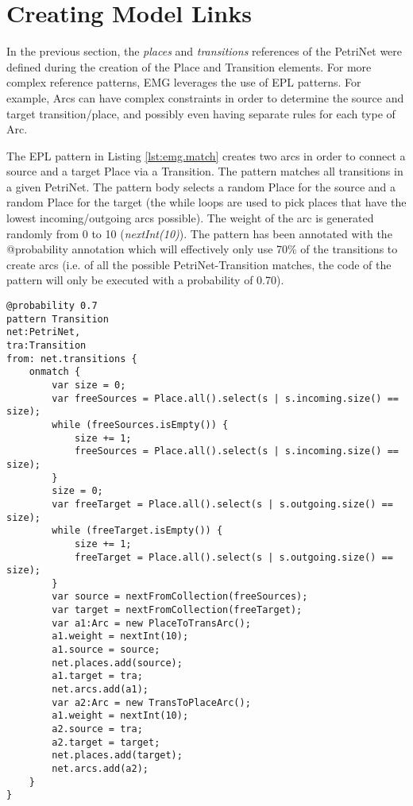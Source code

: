 \section{Creating Model Links}\label{sec:emg.createlinks}

In the previous section, the \emph{places} and \emph{transitions} references of the PetriNet were defined during the creation of the Place and Transition elements. For more complex reference patterns, EMG leverages the use of EPL patterns. For example, Arcs can have complex constraints in order to determine the source and target transition/place, and possibly even having separate rules for each type of Arc.

The EPL pattern in Listing \ref{lst:emg.match} creates two arcs in order to connect a source and a target Place via a Transition. The pattern matches all transitions in a given PetriNet.  The pattern body selects a random Place for the source and a random Place for the target (the while loops are used to pick places that have the lowest incoming/outgoing arcs possible). The weight of the arc is generated randomly from 0 to 10 (\emph{nextInt(10)}). The pattern has been annotated with the @probability annotation which will effectively only use 70\% of the transitions to create arcs (i.e. of all the possible PetriNet-Transition matches, the code of the pattern will only be executed with a probability of 0.70).

\begin{lstlisting}[float=h, caption={EMG create operations}, label=lst:emg.match, language=EPL]
@probability 0.7
pattern Transition
net:PetriNet,
tra:Transition
from: net.transitions {
    onmatch {
        var size = 0;
        var freeSources = Place.all().select(s | s.incoming.size() == size);
        while (freeSources.isEmpty()) {
            size += 1;
            freeSources = Place.all().select(s | s.incoming.size() == size);
        }
        size = 0;
        var freeTarget = Place.all().select(s | s.outgoing.size() == size);
        while (freeTarget.isEmpty()) {
            size += 1;
            freeTarget = Place.all().select(s | s.outgoing.size() == size);
        }
        var source = nextFromCollection(freeSources);
        var target = nextFromCollection(freeTarget);
        var a1:Arc = new PlaceToTransArc();
        a1.weight = nextInt(10);
        a1.source = source;
        net.places.add(source);
        a1.target = tra;
        net.arcs.add(a1);
        var a2:Arc = new TransToPlaceArc();
        a1.weight = nextInt(10);
        a2.source = tra;
        a2.target = target;
        net.places.add(target);
        net.arcs.add(a2);
    }
}
\end{lstlisting}

